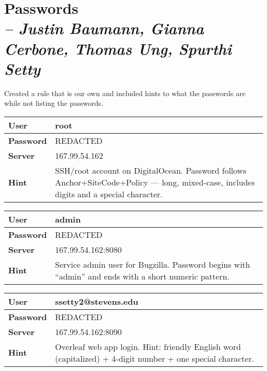 \chapter{Passwords \\
\small{\textit{-- Justin Baumann, Gianna Cerbone, Thomas Ung, Spurthi Setty}}
\label{Chapter::Passwords}}
Created a rule that is our own and included hints to what the passwords are while not listing the passwords. 

\small
\begin{longtable}{|p{3cm}|p{10cm}|}
\hline
\textbf{User} & root \\ \hline
\textbf{Password} & REDACTED \\ \hline
\textbf{Server} & 167.99.54.162 \\ \hline
\textbf{Hint} & SSH/root account on DigitalOcean. Password follows Anchor+SiteCode+Policy — long, mixed-case, includes digits and a special character. \\ \hline
\end{longtable}

\vspace{0.3cm}

\begin{longtable}{|p{3cm}|p{10cm}|}
\hline
\textbf{User} & admin \\ \hline
\textbf{Password} & REDACTED \\ \hline
\textbf{Server} & 167.99.54.162:8080 \\ \hline
\textbf{Hint} & Service admin user for Bugzilla. Password begins with “admin” and ends with a short numeric pattern. \\ \hline
\end{longtable}

\vspace{0.3cm}

\begin{longtable}{|p{3cm}|p{10cm}|}
\hline
\textbf{User} & ssetty2@stevens.edu \\ \hline
\textbf{Password} & REDACTED \\ \hline
\textbf{Server} & 167.99.54.162:8090 \\ \hline
\textbf{Hint} & Overleaf web app login. Hint: friendly English word (capitalized) + 4-digit number + one special character. \\ \hline
\end{longtable}

